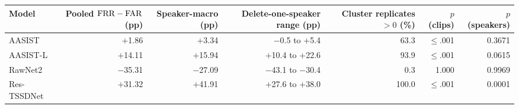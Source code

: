 \begin{tabular}{@{}lrrrrrr@{}}
\toprule
Model & Pooled $\mathrm{FRR}-\mathrm{FAR}$ (pp) & Speaker-macro (pp) & Delete-one-speaker range (pp) & Cluster replicates $>0$ (\%) & $p$ (clips) & $p$ (speakers) \\
\midrule
AASIST & $+$1.86 & $+$3.34 & $-$0.5 to $+$5.4 & 63.3 & $\leq$.001 & 0.3671 \\
AASIST-L & $+$14.11 & $+$15.94 & $+$10.4 to $+$22.6 & 93.9 & $\leq$.001 & 0.0615 \\
RawNet2 & $-$35.31 & $-$27.09 & $-$43.1 to $-$30.4 & 0.3 & 1.000 & 0.9969 \\
Res-TSSDNet & $+$31.32 & $+$41.91 & $+$27.6 to $+$38.0 & 100.0 & $\leq$.001 & 0.0001 \\
\bottomrule
\end{tabular}
